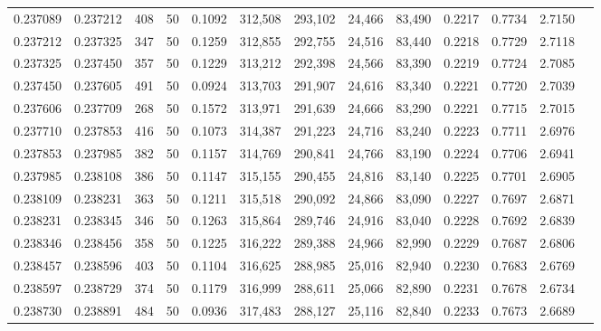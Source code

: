 \begin{tabular}{rrrrrrrrrrrrr}
0.237089 & 0.237212 &   408 &  50 &                                     0.1092 & 312,508 & 293,102 &  24,466 &  83,490 & 0.2217 & 0.7734 & 2.7150 \\
0.237212 & 0.237325 &   347 &  50 &                                     0.1259 & 312,855 & 292,755 &  24,516 &  83,440 & 0.2218 & 0.7729 & 2.7118 \\
0.237325 & 0.237450 &   357 &  50 &                                     0.1229 & 313,212 & 292,398 &  24,566 &  83,390 & 0.2219 & 0.7724 & 2.7085 \\
0.237450 & 0.237605 &   491 &  50 &                                     0.0924 & 313,703 & 291,907 &  24,616 &  83,340 & 0.2221 & 0.7720 & 2.7039 \\
0.237606 & 0.237709 &   268 &  50 &                                     0.1572 & 313,971 & 291,639 &  24,666 &  83,290 & 0.2221 & 0.7715 & 2.7015 \\
0.237710 & 0.237853 &   416 &  50 &                                     0.1073 & 314,387 & 291,223 &  24,716 &  83,240 & 0.2223 & 0.7711 & 2.6976 \\
0.237853 & 0.237985 &   382 &  50 &                                     0.1157 & 314,769 & 290,841 &  24,766 &  83,190 & 0.2224 & 0.7706 & 2.6941 \\
0.237985 & 0.238108 &   386 &  50 &                                     0.1147 & 315,155 & 290,455 &  24,816 &  83,140 & 0.2225 & 0.7701 & 2.6905 \\
0.238109 & 0.238231 &   363 &  50 &                                     0.1211 & 315,518 & 290,092 &  24,866 &  83,090 & 0.2227 & 0.7697 & 2.6871 \\
0.238231 & 0.238345 &   346 &  50 &                                     0.1263 & 315,864 & 289,746 &  24,916 &  83,040 & 0.2228 & 0.7692 & 2.6839 \\
0.238346 & 0.238456 &   358 &  50 &                                     0.1225 & 316,222 & 289,388 &  24,966 &  82,990 & 0.2229 & 0.7687 & 2.6806 \\
0.238457 & 0.238596 &   403 &  50 &                                     0.1104 & 316,625 & 288,985 &  25,016 &  82,940 & 0.2230 & 0.7683 & 2.6769 \\
0.238597 & 0.238729 &   374 &  50 &                                     0.1179 & 316,999 & 288,611 &  25,066 &  82,890 & 0.2231 & 0.7678 & 2.6734 \\
0.238730 & 0.238891 &   484 &  50 &                                     0.0936 & 317,483 & 288,127 &  25,116 &  82,840 & 0.2233 & 0.7673 & 2.6689 \\

\end{tabular}
